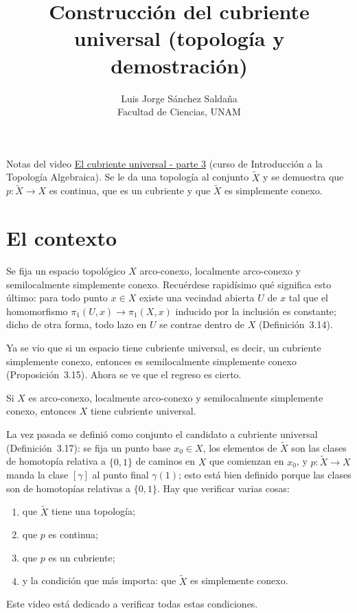 \documentclass[11pt]{article}
\title{Construcción del cubriente universal (topología y demostración)}
\author{Luis Jorge Sánchez Saldaña\\[2pt]\small Facultad de Ciencias, UNAM}
\date{}
\begin{document}
\maketitle

\noindent\small Notas del video
\href{https://www.youtube.com/watch?v=-nXjkdiEcd4}{\guillemotleft{}El cubriente universal - parte 3\guillemotright{}}
(curso de Introducción a la Topología Algebraica). Se le da una topología al conjunto $\tilde X$ y se demuestra que $p\colon\tilde X\to X$ es continua, que es un cubriente y que $\tilde X$ es simplemente conexo.
\normalsize

\section*{El contexto}

Se fija un espacio topológico $X$ arco-conexo, localmente arco-conexo y semilocalmente simplemente conexo. Recuérdese rapidísimo qué significa esto último: para todo punto $x\in X$ existe una vecindad abierta $U$ de $x$ tal que el homomorfismo $\pi_1(U,x)\to\pi_1(X,x)$ inducido por la inclusión es constante; dicho de otra forma, todo lazo en $U$ se contrae dentro de $X$ (Definición~3.14).

Ya se vio que si un espacio tiene cubriente universal, es decir, un cubriente simplemente conexo, entonces es semilocalmente simplemente conexo (Proposición~3.15). Ahora se ve que el regreso es cierto.

\begin{teo}\label{teo:existencia}
Si $X$ es arco-conexo, localmente arco-conexo y semilocalmente simplemente conexo, entonces $X$ tiene cubriente universal.
\end{teo}

La vez pasada se definió como conjunto el candidato a cubriente universal (Definición~3.17): se fija un punto base $x_0\in X$, los elementos de $\tilde X$ son las clases de homotopía relativa a $\{0,1\}$ de caminos en $X$ que comienzan en $x_0$, y $p\colon\tilde X\to X$ manda la clase $[\gamma]$ al punto final $\gamma(1)$; esto está bien definido porque las clases son de homotopías relativas a $\{0,1\}$. Hay que verificar varias cosas:
\begin{enumerate}
  \item que $\tilde X$ tiene una topología;
  \item que $p$ es continua;
  \item que $p$ es un cubriente;
  \item y la condición que más importa: que $\tilde X$ es simplemente conexo.
\end{enumerate}
Este video está dedicado a verificar todas estas condiciones.
\end{document}
